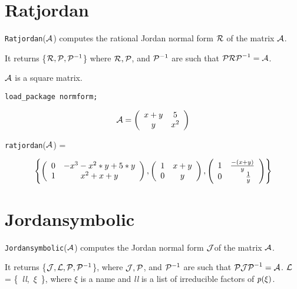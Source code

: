 \section{Ratjordan}

{\tt Ratjordan}(${\cal A}$) computes the rational Jordan normal form
${\cal R}$ of the matrix ${\cal A}$.

It returns \{${\cal R}, {\cal P}, {\cal P}^{-1}$\} where ${\cal R},
{\cal P}$, and ${\cal P}^{-1}$ are such that ${\cal P R P}^{-1} =
{\cal A}$.

${\cal A}$ is a square matrix.

{\tt load\_package normform;}

\begin{displaymath}
{\cal A} = \left( \begin{array}{cc} x+y & 5 \\ y & x^2  \end{array}
\right)
\end{displaymath}

{\tt ratjordan}(${\cal A}$) =
\begin{center}
\begin{displaymath}
\left\{ \left( \begin{array}{cc} 0 & -x^3-x^2*y+5*y \\ 1 &
x^2+x+y \end{array} \right), \left( \begin{array}{cc}
1 & x+y \\ 0 & y \end{array} \right), \left( \begin{array}{cc} 1 &
\frac{-(x+y)}{y} \\ 0 & \hspace{0.2in} \frac{1}{y} \end{array} \right)
\right\}
\end{displaymath}

\end{center}


\section{Jordansymbolic}

{\tt Jordansymbolic}(${\cal A}$) \hspace{0in} computes the Jordan
normal form ${\cal J}$of the matrix ${\cal A}$.

It returns \{${\cal J}, {\cal L}, {\cal P}, {\cal P}^{-1}$\}, where
${\cal J}, {\cal P}$, and ${\cal P}^{-1}$ are such that ${\cal P J P}^
{-1} = {\cal A}$. ${\cal L}$ = \{~{\it ll},~$\xi$~\}, where $\xi$ is
a name and {\it ll} is a list of irreducible factors of ${\it p}(\xi)$.

